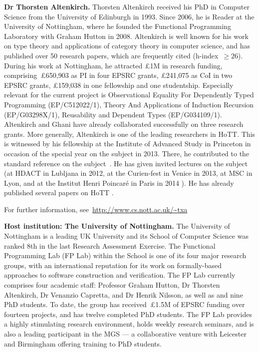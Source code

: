 \documentclass[a4paper,11pt]{article}
\begin{document}
\newpage
\textbf{Dr Thorsten Altenkirch.}  Thorsten Altenkirch received his PhD in
Computer Science from the University of Edinburgh in 1993. Since 2006,
he is Reader at the University of Nottingham,
where he founded the Functional Programming Laboratory with Graham
Hutton in 2008. Altenkirch is well known for his work on type theory
and applications of category theory in computer science, and has
published over 50 research papers, which
are frequently cited (h-index~$\geq 26$).
During his work at Nottingham, he attracted \pounds 1M in research funding,
comprising~\pounds650,903 as PI in four EPSRC grants, \pounds241,075 as
CoI in two EPSRC grants, \pounds159,038 in one fellowship and one
studentship. Especially relevant for the current project is
Observational Equality For Dependently Typed Programming
(EP/C512022/1), Theory And Applications of Induction Recursion
(EP/G03298X/1), Reusability and Dependent Types
(EP/G034109/1). Altenkirch and Ghani have already collaborated
successfully on three research grants. More generally, 
Altenkirch is one of the leading researchers in HoTT.
This is witnessed by his fellowship at the Institute of Advanced Study
in Princeton in occasion of the special year on the subject in 2013. There, he contributed to the standard reference on the
subject~\cite{hott-book}.  He has given invited lectures on the
subject (at HDACT in Lubljana in 2012, at the Curien-fest in Venice in
2013, at MSC in Lyon, and at the Institut Henri Poincar\'e in Paris in
2014 \cite{txa-ihp14}). He has already published several papers on HoTT
\cite{altenkirch:extSetoids,alti:ott-conf,alti:csl12,alti:tlca13-hedberg}.

For further information, see~\url{http://www.cs.nott.ac.uk/~txa}

\textbf{Host institution: The University of Nottingham.}  The
University of Nottingham is a leading UK University 
and its School of Computer Science was ranked 8th in the last Research
Assessment Exercise. The Functional Programming Lab (FP Lab) within the School
is one of its four major research groups, with an international
reputation for its work on formally-based approaches to software
construction and verification.  The FP Lab currently comprises four
academic staff: Professor Graham Hutton, Dr Thorsten Altenkirch, Dr
Venanzio Capretta, and Dr Henrik Nilsson, as well as and nine PhD students.
To date, the group has received~\pounds1.5M of EPSRC funding over fourteen
projects, and has twelve completed PhD students.
The FP Lab provides a highly stimulating research environment,
holds weekly research seminars, and is also a leading participant in the MGS
--- a collaborative venture with Leicester and Birmingham offering training
to PhD students.
\noindent
\end{document}
